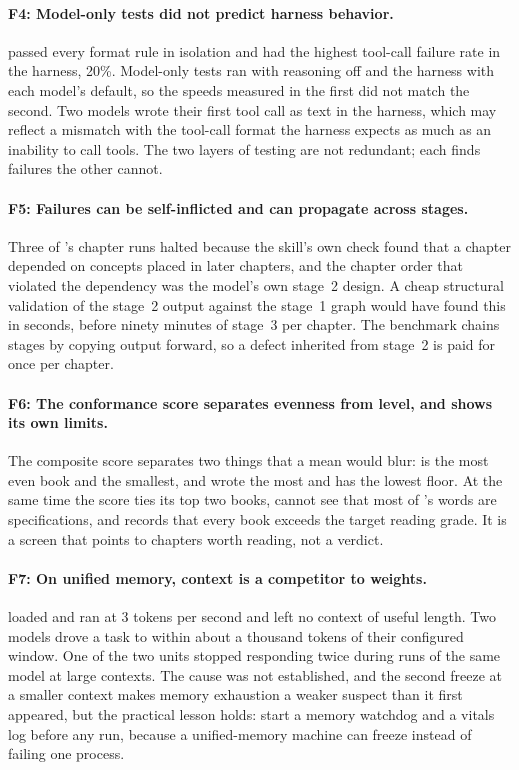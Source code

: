 \paragraph{F4: Model-only tests did not predict harness behavior.}
\Gthirtyone{} passed every format rule in isolation and had the highest tool-call failure rate in the harness, 20\%. Model-only tests ran with reasoning off and the harness with each model's default, so the speeds measured in the first did not match the second. Two models wrote their first tool call as text in the harness, which may reflect a mismatch with the tool-call format the harness expects as much as an inability to call tools. The two layers of testing are not redundant; each finds failures the other cannot.

\paragraph{F5: Failures can be self-inflicted and can propagate across stages.}
Three of \Gtwentysix's chapter runs halted because the skill's own check found that a chapter depended on concepts placed in later chapters, and the chapter order that violated the dependency was the model's own stage~2 design. A cheap structural validation of the stage~2 output against the stage~1 graph would have found this in seconds, before ninety minutes of stage~3 per chapter. The benchmark chains stages by copying output forward, so a defect inherited from stage~2 is paid for once per chapter.

\paragraph{F6: The conformance score separates evenness from level, and shows its own limits.}
The composite score separates two things that a mean would blur: \Gptoss{} is the most even book and the smallest, and \Nemo{} wrote the most and has the lowest floor. At the same time the score ties its top two books, cannot see that most of \Gptoss's words are specifications, and records that every book exceeds the target reading grade. It is a screen that points to chapters worth reading, not a verdict.

\paragraph{F7: On unified memory, context is a competitor to weights.}
\Mistral{} loaded and ran at 3 tokens per second and left no context of useful length. Two models drove a task to within about a thousand tokens of their configured window. One of the two units stopped responding twice during runs of the same model at large contexts. The cause was not established, and the second freeze at a smaller context makes memory exhaustion a weaker suspect than it first appeared, but the practical lesson holds: start a memory watchdog and a vitals log before any run, because a unified-memory machine can freeze instead of failing one process.

